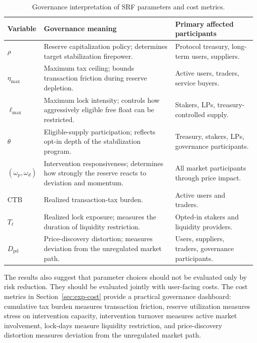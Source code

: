 \documentclass[a4paper,fleqn]{cas-dc}
\begin{document}
\begin{table}[htbp]
\centering
\caption{Governance interpretation of SRF parameters and cost metrics.}
\label{tab:governance_dashboard}
\footnotesize
\setlength{\tabcolsep}{4pt}
\renewcommand{\arraystretch}{1.15}
\begin{tabular}{|p{}|p{}|p{}|}
\hline
\textbf{Variable} & \textbf{Governance meaning} & \textbf{Primary affected participants} \\
\hline

\(\rho\) &
Reserve capitalization policy; determines target stabilization firepower. &
Protocol treasury, long-term users, suppliers. \\
\hline

\(\eta_{\max}\) &
Maximum tax ceiling; bounds transaction friction during reserve depletion. &
Active users, traders, service buyers. \\
\hline

\(\ell_{\max}\) &
Maximum lock intensity; controls how aggressively eligible free float can be restricted. &
Stakers, LPs, treasury-controlled supply. \\
\hline

\(\theta\) &
Eligible-supply participation; reflects opt-in depth of the stabilization program. &
Treasury, stakers, LPs, governance participants. \\
\hline

\((\omega_p,\omega_d)\) &
Intervention responsiveness; determines how strongly the reserve reacts to deviation and momentum. &
All market participants through price impact. \\
\hline

\(\mathrm{CTB}\) &
Realized transaction-tax burden. &
Active users and traders. \\
\hline

\(T_\ell\) &
Realized lock exposure; measures the duration of liquidity restriction. &
Opted-in stakers and liquidity providers. \\
\hline

\(D_{\mathrm{pd}}\) &
Price-discovery distortion; measures deviation from the unregulated market path. &
Users, suppliers, traders, governance participants. \\
\hline

\end{tabular}
\end{table}

The results also suggest that parameter choices should not be evaluated only by risk reduction. They should be evaluated jointly with user-facing costs. The cost metrics in Section~\ref{sec:exp-cost} provide a practical governance dashboard: cumulative tax burden measures transaction friction, reserve utilization measures stress on intervention capacity, intervention turnover measures active market involvement, lock-days measure liquidity restriction, and price-discovery distortion measures deviation from the unregulated market path.
\end{document}
